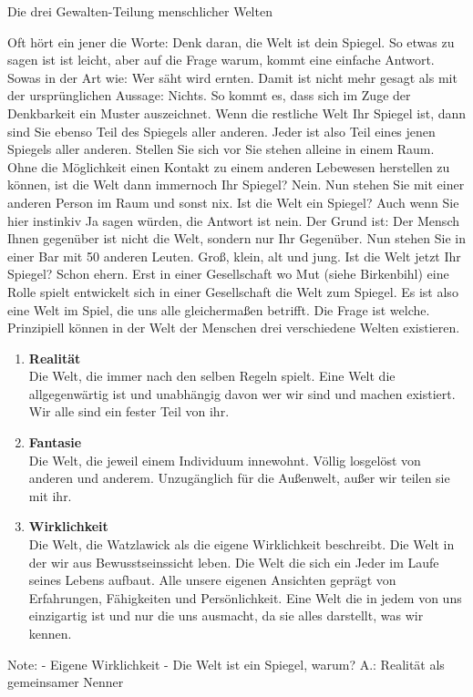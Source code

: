 Die drei Gewalten-Teilung menschlicher Welten

Oft hört ein jener die Worte: Denk daran, die Welt ist dein Spiegel. So etwas zu sagen ist ist leicht, aber auf die Frage warum, kommt eine einfache Antwort.
Sowas in der Art wie: Wer säht wird ernten. Damit ist nicht mehr gesagt als mit der ursprünglichen Aussage: Nichts. So kommt es, dass sich im Zuge der Denkbarkeit ein Muster auszeichnet. 
Wenn die restliche Welt Ihr Spiegel ist, dann sind Sie ebenso
Teil des Spiegels aller anderen. Jeder ist also Teil eines jenen Spiegels aller anderen. Stellen Sie sich vor Sie stehen alleine in einem Raum. Ohne die Möglichkeit einen
Kontakt zu einem anderen Lebewesen herstellen zu können, ist die Welt dann immernoch Ihr Spiegel? Nein. Nun stehen Sie mit einer anderen Person im Raum und sonst nix. Ist die Welt ein Spiegel?
Auch wenn Sie hier instinkiv Ja sagen würden, die Antwort ist nein. Der Grund ist: Der Mensch Ihnen gegenüber ist nicht die Welt, sondern nur Ihr Gegenüber. Nun stehen Sie in einer
Bar mit 50 anderen Leuten. Groß, klein, alt und jung. Ist die Welt jetzt Ihr Spiegel? Schon ehern. Erst in einer Gesellschaft wo Mut (siehe Birkenbihl) eine Rolle spielt entwickelt
sich in einer Gesellschaft die Welt zum Spiegel. Es ist also eine Welt im Spiel, die uns alle gleichermaßen betrifft. Die Frage ist welche. Prinzipiell können in der Welt der Menschen
drei verschiedene Welten existieren.
\begin{enumerate}
    \item \textbf{Realität}\\
    Die Welt, die immer nach den selben Regeln spielt. Eine Welt die allgegenwärtig ist und unabhängig davon wer wir sind und machen existiert. Wir alle sind ein fester Teil von ihr.
    \item \textbf{Fantasie}\\
    Die Welt, die jeweil einem Individuum innewohnt. Völlig losgelöst von anderen und anderem. Unzugänglich für die Außenwelt, außer wir teilen sie mit ihr.
    \item \textbf{Wirklichkeit}\\
    Die Welt, die Watzlawick als die eigene Wirklichkeit beschreibt. Die Welt in der wir aus Bewusstseinssicht leben. Die Welt die sich ein Jeder im Laufe seines Lebens aufbaut.
    Alle unsere eigenen Ansichten geprägt von Erfahrungen, Fähigkeiten und Persönlichkeit. Eine Welt die in jedem von uns einzigartig ist und nur die uns ausmacht, da sie alles 
    darstellt, was wir kennen.
\end{enumerate}









Note:
- Eigene Wirklichkeit
- Die Welt ist ein Spiegel, warum? A.: Realität als gemeinsamer Nenner
